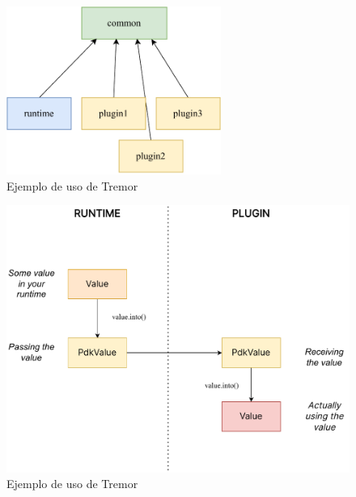 \begin{figure}
    \centering
    \includegraphics[width=7cm]{./Imagenes/separation.pdf}
    \caption{Ejemplo de uso de Tremor}%
    \label{fig:separation}
\end{figure}

\begin{figure}
    \centering
    \includegraphics[width=\textwidth]{./Imagenes/simplify.pdf}
    \caption{Ejemplo de uso de Tremor}%
    \label{fig:simplify}
\end{figure}

